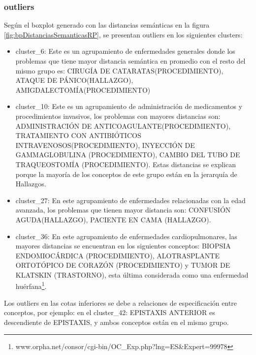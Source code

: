 \subsubsection{outliers}
Según el boxplot generado con las distancias semánticas en la figura \ref{fig:bpDistanciasSemanticasRP}, se presentan outliers en los siguientes clusters:
\begin{itemize}
\item cluster\_6: Este es un agrupamiento de enfermedades generales donde los problemas que tiene mayor distancia semántica en promedio con el resto del mismo grupo es: CIRUGÍA DE CATARATAS(PROCEDIMIENTO), ATAQUE DE PÁNICO(HALLAZGO), AMIGDALECTOMÍA(PROCEDIMIENTO)
\item cluster\_10: Este es un agrupamiento de administración de medicamentos y procedimientos invasivos, los problemas con mayores distancias son: ADMINISTRACIÓN DE ANTICOAGULANTE(PROCEDIMIENTO), TRATAMIENTO CON ANTIBIÓTICOS INTRAVENOSOS(PROCEDIMIENTO), INYECCIÓN DE GAMMAGLOBULINA (PROCEDIMIENTO), CAMBIO DEL TUBO DE TRAQUEOSTOMÍA (PROCEDIMIENTO). Estas distancias se explican porque la mayoría de los conceptos de este grupo están en la jerarquía de Hallazgos.
\item cluster\_27: En este agrupamiento de enfermedades relacionadas con la edad avanzada, los problemas que tienen mayor distancia son: CONFUSIÓN AGUDA(HALLAZGO), PACIENTE EN CAMA (HALLAZGO).
\item cluster\_36: En este agrupamiento de enfermedades cardiopulmonares, las mayores distancias se encuentran en los siguientes conceptos: BIOPSIA ENDOMIOCÁRDICA (PROCEDIMIENTO), ALOTRASPLANTE ORTOTÓPICO DE CORAZÓN (PROCEDIMIENTO) y TUMOR DE KLATSKIN (TRASTORNO), esta última considerada como una enfermedad huérfana\footnote{www.orpha.net/consor/cgi-bin/OC\_Exp.php?lng=ES\&Expert=99978}.
\end{itemize}

Los outliers en las cotas inferiores se debe a relaciones de especificación entre conceptos, por ejemplo: en el cluster\_42: EPISTAXIS ANTERIOR es descendiente de EPISTAXIS, y ambos conceptos están en el mismo grupo.

